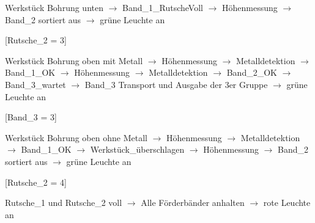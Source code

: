 \documentclass[a4paper, 11pt]{article}
\begin{document}
\begin{compactenum}[1.]
    [Band\_3 = 2]\medskip
    \item Werkstück Bohrung unten $\rightarrow$ Band\_1\_RutscheVoll $\rightarrow$ Höhenmessung $\rightarrow$ Band\_2 sortiert aus $\rightarrow$ grüne Leuchte an
    
    [Rutsche\_2 = 3]\medskip
    \item Werkstück Bohrung oben mit Metall $\rightarrow$ Höhenmessung $\rightarrow$ Metalldetektion $\rightarrow$ Band\_1\_OK $\rightarrow$ Höhenmessung $\rightarrow$ Metalldetektion 
    $\rightarrow$ Band\_2\_OK $\rightarrow$ Band\_3\_wartet $\rightarrow$ Band\_3 Transport und Ausgabe der 3er Gruppe $\rightarrow$ grüne Leuchte an
    
    [Band\_3 = 3]\medskip
    \item Werkstück Bohrung oben ohne Metall $\rightarrow$ Höhenmessung $\rightarrow$ Metalldetektion $\rightarrow$ Band\_1\_OK $\rightarrow$ Werkstück\_überschlagen $\rightarrow$ 
    Höhenmessung $\rightarrow$ Band\_2 sortiert aus $\rightarrow$ grüne Leuchte an
    
    [Rutsche\_2 = 4]\medskip 
    \item Rutsche\_1 und Rutsche\_2 voll $\rightarrow$ Alle Förderbänder anhalten $\rightarrow$ rote Leuchte an
\end{compactenum}

\newpage
\end{document}
